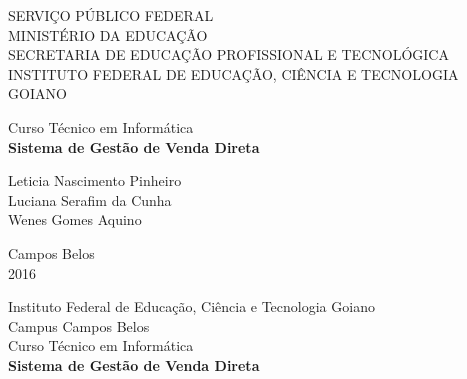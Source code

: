 \documentclass[chapter=TITLE,12pt,oneside,a4paper,english,french,sumario=tradicional,spanish,brazil,]{abntex2}
\begin{document}
\vspace*{-3.9cm}

{
\begin{center}\footnotesize
    \hspace*{0.25cm}SERVIÇO PÚBLICO FEDERAL \\
    \hspace*{0.25cm}MINISTÉRIO DA EDUCAÇÃO \\
    \hspace*{0.25cm}SECRETARIA DE EDUCAÇÃO PROFISSIONAL E TECNOLÓGICA \\
    \hspace*{0.25cm}INSTITUTO FEDERAL DE EDUCAÇÃO, CIÊNCIA E TECNOLOGIA\\
    \hspace*{0.25cm}GOIANO
\end{center}
}

\vspace{1.5cm}

\begin{center}
    {\Large Curso Técnico em Informática} \\[1cm]
    {\LARGE  \textbf{Sistema de Gestão de Venda Direta}} \\[5cm]
\end{center}

\begin{center}
    {\Large  Leticia Nascimento Pinheiro }\\[6mm]
    {\Large  Luciana Serafim da Cunha }\\[6mm]
    {\Large  Wenes Gomes Aquino }\\[6mm]
\end{center}

\vspace{7.1cm}    %

\begin{center}
{\large {Campos Belos}\\[3mm]
			2016}
\end{center}


\newpage\thispagestyle{empty}
\begin{center}
{\Large Instituto Federal de Educação, Ciência e Tecnologia Goiano\\
        Campus Campos Belos\\[6mm]
  	    Curso Técnico em Informática\\[2cm]}
{\LARGE  \textbf{Sistema de Gestão de Venda Direta}} \\[3cm]
\end{center}
\end{document}
